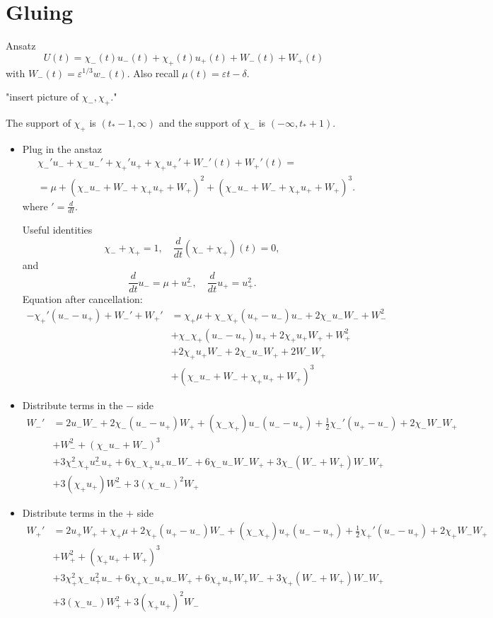 \documentclass[letterpaper,11pt]{article}
\newcommand{\eps}{\varepsilon}
\numberwithin{equation}{section}
\theoremstyle{plain}
\begin{document}
\section{Gluing}
Ansatz
\[
U(t) = \chi_-(t)u_-(t) + \chi_+(t)u_+(t) + W_-(t)+W_+(t)
\]
with $W_-(t) = \eps^{1/3}w_-(t)$. Also recall $\mu(t) = \eps t- \delta$.

"insert picture of $\chi_-,\chi_+$."

The support of $\chi_+$ is $(t_*-1,\infty)$ and  the support of $\chi_-$ is $(-\infty, t_*+1)$.

\begin{itemize}
\item 
Plug in the anstaz
\begin{align*}
&\chi_-' u_- + \chi_- u_-' + \chi_+' u_+ + \chi_+ u_+' +W_-'(t)+W_+'(t) = \\
&=\mu +(\chi_-u_-+W_-+\chi_+u_+ +W_+)^2 +(\chi_-u_-+W_-+\chi_+u_+ +W_+)^3.
\end{align*}
where $' = \frac{d}{dt}$.

Useful identities 
\[
\chi_-+\chi_+ = 1, \quad \frac{d}{dt}(\chi_-+\chi_+)(t) = 0,
\]
and
\[ 
 \frac{d}{dt} u_- = \mu+ u_-^2, \quad \frac{d}{dt} u_+ = u_+^2.
 \]
Equation after cancellation:
\begin{align*}
-\chi_+'(u_- -u_+) +W_-'+W_+' &= \chi_+\mu +\chi_-\chi_+(u_+ - u_-)u_- +2\chi_- u_- W_- +W_-^2 \\
&+\chi_-\chi_+(u_- -u_+)u_+ + 2\chi_+ u_+W_+ + W_+^2 \\
&+ 2\chi_+ u_+ W_- + 2\chi_- u_- W_+ + 2W_-W_+\\
&+ (\chi_-u_-+W_- + \chi_+u_+ +W_+)^3
\end{align*}

\item Distribute terms in the $-$ side 
\begin{align*}
W_-'  &= 2u_-W_- +2\chi_-(u_- -u_+)W_+ + (\chi_-\chi_+) u_-(u_- -u_+)+\frac{1}{2}\chi_-'(u_+ -u_-) +2\chi_-W_-W_+\\
&+W_-^2+ (\chi_-u_- + W_-)^3\\
&+ 3\chi_-^2\chi_+ u_-^2 u_+  + 6\chi_-\chi_+ u_+ u_-W_- + 6\chi_- u_- W_- W_+ + 3\chi_-(W_-+W_+)W_-W_+ \\&+3(\chi_+u_+)W_-^2 + 3(\chi_-u_-)^2W_+
\end{align*}

\item Distribute terms in the $+$ side 
\begin{align*}
W_+'  &= 2u_+W_+ + \chi_+\mu + 2\chi_+(u_+ -u_-)W_-+ (\chi_-\chi_+) u_+(u_- -u_+)+\frac{1}{2}\chi_+'(u_- -u_+) +2\chi_+W_-W_+\\
&+W_+^2+ (\chi_+u_+ + W_+)^3 \\
&+ 3\chi_+^2\chi_-u_+^2u_- + 6\chi_+\chi_- u_+u_- W_+ +6 \chi_+u_+W_+W_- +3\chi_+(W_-+W_+)W_-W_+\\
&+3(\chi_-u_-)W_+^2 + 3(\chi_+u_+)^2W_-
\end{align*}



\end{itemize}
\end{document}
